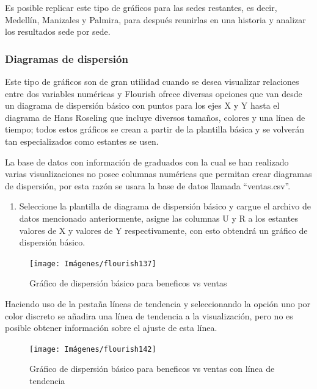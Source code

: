 \documentclass[
]{book}
\providecommand{\tightlist}{%
  \setlength{\itemsep}{0pt}\setlength{\parskip}{0pt}}
\begin{document}
Es posible replicar este tipo de gráficos para las sedes restantes, es decir, Medellín, Manizales y Palmira, para después reunirlas en una historia y analizar los resultados sede por sede.

\hypertarget{dispersionflourish}{%
\subsubsection{Diagramas de dispersión}\label{dispersionflourish}}

Este tipo de gráficos son de gran utilidad cuando se desea visualizar relaciones entre dos variables numéricas y Flourish ofrece diversas opciones que van desde un diagrama de dispersión básico con puntos para los ejes X y Y hasta el diagrama de Hans Roseling que incluye diversos tamaños, colores y una línea de tiempo; todos estos gráficos se crean a partir de la plantilla básica y se volverán tan especializados como estantes se usen.

La base de datos con información de graduados con la cual se han realizado varias visualizaciones no posee columnas numéricas que permitan crear diagramas de dispersión, por esta razón se usara la base de datos llamada ``ventas.csv''.

\begin{enumerate}
\def\labelenumi{\arabic{enumi}.}
\tightlist
\item
  Seleccione la plantilla de diagrama de dispersión básico y cargue el archivo de datos mencionado anteriormente, asigne las columnas U y R a los estantes valores de X y valores de Y respectivamente, con esto obtendrá un gráfico de dispersión básico.
\end{enumerate}

\begin{figure}

{\centering \texttt{[image: Imágenes/flourish137]} 

}

\caption{Gráfico de dispersión básico para beneficos vs ventas}\label{fig:dispersionbasicoflourish-fig}
\end{figure}

Haciendo uso de la pestaña líneas de tendencia y seleccionando la opción uno por color discreto se añadira una línea de tendencia a la visualización, pero no es posible obtener información sobre el ajuste de esta línea.

\begin{figure}

{\centering \texttt{[image: Imágenes/flourish142]} 

}

\caption{Gráfico de dispersión básico para beneficos vs ventas con línea de tendencia}\label{fig:dispersionbasicotendenciaflourish-fig}
\end{figure}
\end{document}
